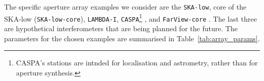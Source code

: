 \documentclass[
  journal=pasa,
  manuscript=article-type,
  year=2020,
  volume=37,
]{cup-journal}
\begin{document}
The specific aperture array examples we consider are the \texttt{SKA-low}, core of the SKA-low (\texttt{SKA-low-core}), \texttt{LAMBDA-I}, \texttt{CASPA}\footnote{CASPA's stations are intnded for localisation and astrometry, rather than for aperture synthesis.} \citep{Luo+2024}, and \texttt{FarView-core} \citep{Polidan+2024}. The last three are hypothetical interferometers that are being planned for the future. 
The parameters for the chosen examples are summarised in Table~\ref{tab:array_params}. 

\end{document}
